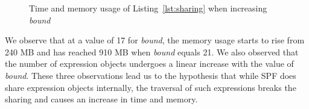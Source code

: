 \begin{figure}%
    \centering
    \qquad
    \caption{Time and memory usage of Listing~\ref{lst:sharing} when increasing \textit{bound}}%
    \label{fig:sharing}%
    \vspace{-0.2in}
\end{figure}
%
We observe that at a value of 17 for \textit{bound}, the memory usage starts to rise from 240 MB and has reached 910 MB when \textit{bound} equals 21.
%
We also observed that the number of expression objects undergoes a linear increase with the value of \textit{bound}.
%
These three observations lead us to the hypothesis that while SPF does share expression objects internally, the traversal of such expressions breaks the sharing and causes an increase in time and memory.
%
%
%
